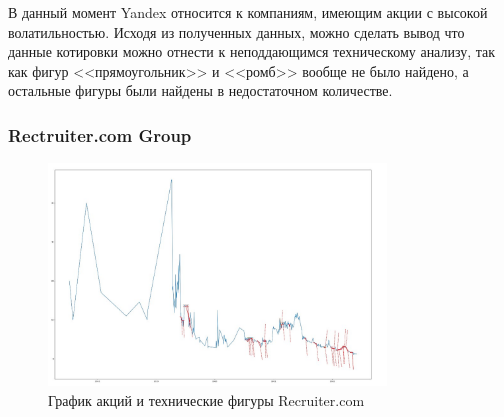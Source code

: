 \documentclass[bachelor, och, coursework]{SCWorks}
\begin{document}
    В данный момент Yandex относится к компаниям, имеющим акции с 
    высокой волатильностью. Исходя из полученных данных, можно сделать вывод
    что данные котировки можно отнести к неподдающимся техническому анализу, 
    так как фигур <<прямоугольник>> и <<ромб>> вообще не было найдено, а
    остальные фигуры были найдены в недостаточном количестве.
    

    \subsubsection{Rectruiter.com Group}
    
    \begin{figure}[H]
        \centering
        \includegraphics[width=0.8\textwidth]{pic/RCRT.jpg}
        \caption{График акций и технические фигуры Recruiter.com}
    \end{figure}
   
\end{document}
